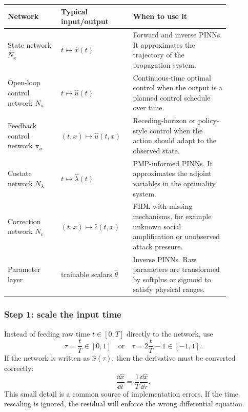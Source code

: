 \documentclass[11pt,a4paper]{article}
\begin{document}
\begin{longtable}{p{0.22\linewidth}p{0.24\linewidth}p{0.40\linewidth}}
\toprule
Network & Typical input/output & When to use it \\
\midrule
State network $N_x$ & $t \mapsto \hat{x}(t)$ & Forward and inverse PINNs. It approximates the trajectory of the propagation system. \\
Open-loop control network $N_u$ & $t \mapsto \hat{u}(t)$ & Continuous-time optimal control when the output is a planned control schedule over time. \\
Feedback control network $\pi_u$ & $(t,x) \mapsto \hat{u}(t,x)$ & Receding-horizon or policy-style control when the action should adapt to the observed state. \\
Costate network $N_\lambda$ & $t \mapsto \hat{\lambda}(t)$ & PMP-informed PINNs. It approximates the adjoint variables in the optimality system. \\
Correction network $N_c$ & $(t,x) \mapsto \hat{c}(t,x)$ & PIDL with missing mechanisms, for example unknown social amplification or unobserved attack pressure. \\
Parameter layer & trainable scalars $\hat{\theta}$ & Inverse PINNs. Raw parameters are transformed by softplus or sigmoid to satisfy physical ranges. \\
\bottomrule
\end{longtable}

\subsubsection*{Step 1: scale the input time}
Instead of feeding raw time $t\in[0,T]$ directly to the network, use
\begin{equation}
    \tau=\frac{t}{T}\in[0,1]
    \quad \text{or} \quad
    \tau=2\frac{t}{T}-1\in[-1,1].
\end{equation}
If the network is written as $\hat{x}(\tau)$, then the derivative must be converted correctly:
\begin{equation}
    \frac{\dd \hat{x}}{\dd t}=\frac{1}{T}\frac{\dd \hat{x}}{\dd \tau}.
\end{equation}
This small detail is a common source of implementation errors. If the time rescaling is ignored, the residual will enforce the wrong differential equation.
\end{document}
